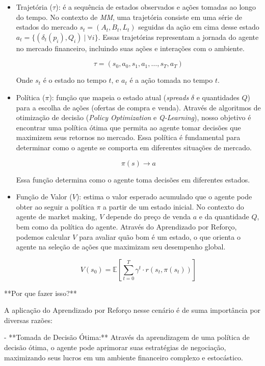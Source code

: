 \begin{itemize}
	\item Trajetória ($\tau$): é a sequência de estados observados e ações tomadas ao longo do tempo. No contexto de \textit{MM}, uma trajetória consiste em uma série de estados do mercado $s_{t} = (A_{t}, B_{t}, L_{t})$ seguidas da ação em cima desse estado $a_{t} = \{(\delta_{t}(p_{i}), Q_{i}) \ | \ \forall i \}$. Essas trajetórias representam a jornada do agente no mercado financeiro, incluindo suas ações e interações com o ambiente.
	
	\[
	\tau = (s_0, a_0, s_1, a_1, \ldots, s_T, a_T)
	\]
	
	Onde \(s_t\) é o estado no tempo \(t\), e \(a_t\) é a ação tomada no tempo \(t\).
	
	\item Política ($\pi$): função que mapeia o estado atual (\textit{spreads} $\delta$ e quantidades $Q$) para a escolha de ações (ofertas de compra e venda). Através de algoritmos de otimização de decisão (\textit{Policy Optimization} e \textit{Q-Learning}), nosso objetivo é encontrar uma política ótima que permita ao agente tomar decisões que maximizem seus retornos no mercado. Essa política é fundamental para determinar como o agente se comporta em diferentes situações de mercado.
	
	\[
	\pi(s) \rightarrow a
	\]
	
	Essa função determina como o agente toma decisões em diferentes estados.
	
	\item Função de Valor ($V$): estima o valor esperado acumulado que o agente pode obter ao seguir a política \(\pi\) a partir de um estado inicial. No contexto do agente de market making, \(V\) depende do preço de venda \(a\) e da quantidade \(Q\), bem como da política do agente. Através do Aprendizado por Reforço, podemos calcular \(V\) para avaliar quão bom é um estado, o que orienta o agente na seleção de ações que maximizam seu desempenho global.
	
	\begin{equation*}
		V(s_0) = \mathbb{E}\left[\sum_{t=0}^{T} \gamma^t \cdot r(s_t, \pi(s_t)) \right]
		\end{equation*}
\end{itemize}


**Por que fazer isso?**

A aplicação do Aprendizado por Reforço nesse cenário é de suma importância por diversas razões:

- **Tomada de Decisão Ótima:** Através da aprendizagem de uma política de decisão ótima, o agente pode aprimorar suas estratégias de negociação, maximizando seus lucros em um ambiente financeiro complexo e estocástico.

